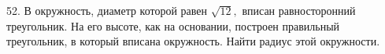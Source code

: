 52. В окружность, диаметр которой равен $\sqrt{12},$ вписан равносторонний треугольник. На его высоте, как на основании, построен правильный треугольник, в который вписана окружность. Найти радиус этой окружности.\\
